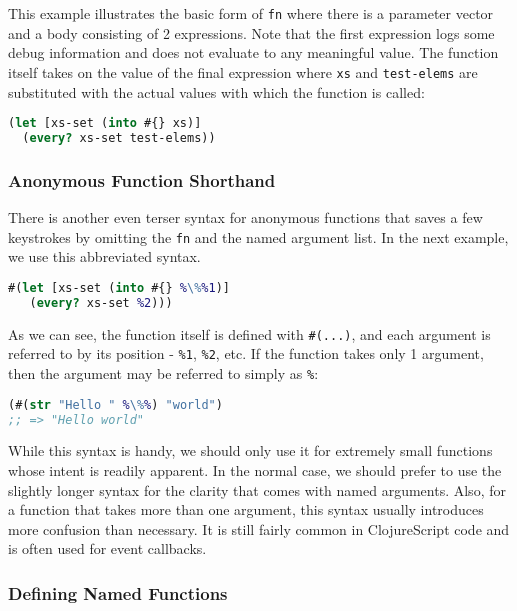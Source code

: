 \documentclass[10pt,twoside,openright]{memoir}
\begin{document}
This example illustrates the basic form of \texttt{fn} where there is a
parameter vector and a body consisting of 2 expressions. Note that the
first expression logs some debug information and does not evaluate to
any meaningful value. The function itself takes on the value of the
final expression where \texttt{xs} and \texttt{test-elems} are
substituted with the actual values with which the function is called:

\begin{lstlisting}[language=Clojure]
(let [xs-set (into #{} xs)]
  (every? xs-set test-elems))
\end{lstlisting}

\subsubsection{Anonymous Function Shorthand}

There is another even terser syntax for anonymous functions that saves a
few keystrokes by omitting the \texttt{fn} and the named argument list.
In the next example, we use this abbreviated syntax.

\begin{lstlisting}[language=Clojure, caption={Shorter anonymous functions}]
#(let [xs-set (into #{} %\%%1)]
   (every? xs-set %2)))
\end{lstlisting}

As we can see, the function itself is defined with \texttt{\#(...)}, and
each argument is referred to by its position - \texttt{\%1},
\texttt{\%2}, etc. If the function takes only 1 argument, then the
argument may be referred to simply as \texttt{\%}:

\begin{lstlisting}[language=Clojure]
(#(str "Hello " %\%%) "world")
;; => "Hello world"
\end{lstlisting}

While this syntax is handy, we should only use it for extremely small
functions whose intent is readily apparent. In the normal case, we
should prefer to use the slightly longer syntax for the clarity that
comes with named arguments. Also, for a function that takes more than
one argument, this syntax usually introduces more confusion than
necessary. It is still fairly common in ClojureScript code and is often
used for event callbacks.


\subsubsection{Defining Named Functions}
\end{document}
